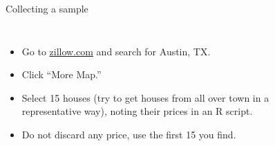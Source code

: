 \documentclass{beamer}\usepackage[]{graphicx}\usepackage[]{color}
\begin{document}
\begin{darkframes}
\begin{frame}[label=lists]{Collecting a sample}
    \begin{columns}[onlytextwidth]
        	\begin{itemize}
          \item Go to \url{zillow.com} and search for Austin, TX.
   				\item Click ``More Map.''
   				\item Select 15 houses (try to get houses from all over town in a representative way), noting their prices in an R script. 
   				\item Do not discard any price, use the first 15 you find.
			\end{itemize}
        
         
        	
        	\begin{figure} 
				\centering
				\setlength\fboxsep{0pt}
				\setlength\fboxrule{0.5pt} 
			\end{figure} 	
        	        
        \end{columns}
					
    \end{frame}  
    
    
    

\end{darkframes}
\end{document}
